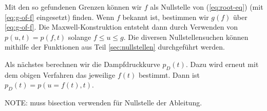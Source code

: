 \documentclass[10pt]{article}
\newenvironment{Figure}
  {\par\medskip\noindent\minipage{\linewidth}}
  {\endminipage\par\medskip}
\begin{document}
\begin{multicols}{2}
  Mit den so gefundenen Grenzen können wir $f$ als Nullstelle von (\ref{eq:root-eq}) (mit \ref{eq:g-of-f} eingesetzt) finden.
  Wenn $f$ bekannt ist, bestimmen wir $g(f)$ über \ref{eq:g-of-f}.
  Die Maxwell-Konstruktion entsteht dann durch Verwenden von $p(u, t) = p(f, t)$ solange $f \leq u \leq g$.
  Die diversen Nullstellensuchen können mithilfe der Funktionen aus Teil \ref{sec:nullstellen} durchgeführt werden.


  \begin{Figure}
    \centering\resizebox{\textwidth}{!}{}
  \end{Figure}

  Als nächstes berechnen wir die Dampfdruckkurve $p_D(t)$. Dazu wird erneut mit dem obigen Verfahren das jeweilige $f(t)$ bestimmt.
  Dann ist $p_D(t) = p(u=f(t), t)$.

  NOTE: muss bisection verwenden für Nullstelle der Ableitung.


\end{multicols}
\end{document}
